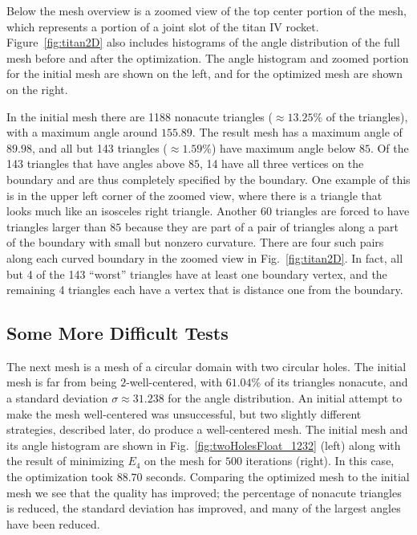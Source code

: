 \documentclass[final]{siamltex}
\begin{document}
Below the mesh overview is a zoomed view of the top center portion of
the mesh, which represents a portion of a joint slot of the titan IV
rocket.  Figure~\ref{fig:titan2D} also includes histograms of the
angle distribution of the full mesh before and after the optimization.
The angle histogram and zoomed portion for the initial mesh are shown
on the left, and for the optimized mesh are shown on the right.

In the initial mesh there are 1188 nonacute triangles
($\approx13.25\%$ of the triangles), with a maximum angle around
$155.89$\textdegree.  The result mesh has a maximum angle of
$89.98$\textdegree, and all but 143 triangles ($\approx1.59\%$) have
maximum angle below $85$\textdegree.  Of the 143 triangles that have
angles above $85$\textdegree, 14 have all three vertices on the
boundary and are thus completely specified by the boundary.  One
example of this is in the upper left corner of the zoomed view, where
there is a triangle that looks much like an isosceles right triangle.
Another 60 triangles are forced to have triangles larger than
$85$\textdegree{} because they are part of a pair of triangles along a
part of the boundary with small but nonzero curvature.
There are four such pairs along each
curved boundary in the zoomed view in Fig.~\ref{fig:titan2D}.  In
fact, all but 4 of the 143 ``worst'' triangles have at least one
boundary vertex, and the remaining 4 triangles each have a vertex that
is distance one from the boundary.


\subsection{Some More Difficult Tests} \label{subsec:twoholes}

The next mesh is a mesh of a circular domain with two circular
holes.  The initial mesh is far from being $2$-well-centered,
with $61.04\%$ of its triangles nonacute, and a standard deviation
$\sigma \approx 31.238$ for the angle distribution.  An initial
attempt to make the mesh well-centered was unsuccessful, but
two slightly different strategies, described later, do produce
a well-centered mesh.  The initial mesh and its angle histogram
are shown in Fig.~\ref{fig:twoHolesFloat_1232} (left)
along with the result of minimizing $E_{4}$ on the mesh
for $500$ iterations (right). In this case, the optimization
took $88.70$ seconds.  Comparing the optimized mesh to
the initial mesh we see that the quality has improved; the
percentage of nonacute triangles is reduced, the standard
deviation has improved, and many of the largest angles
have been reduced.
\end{document}
